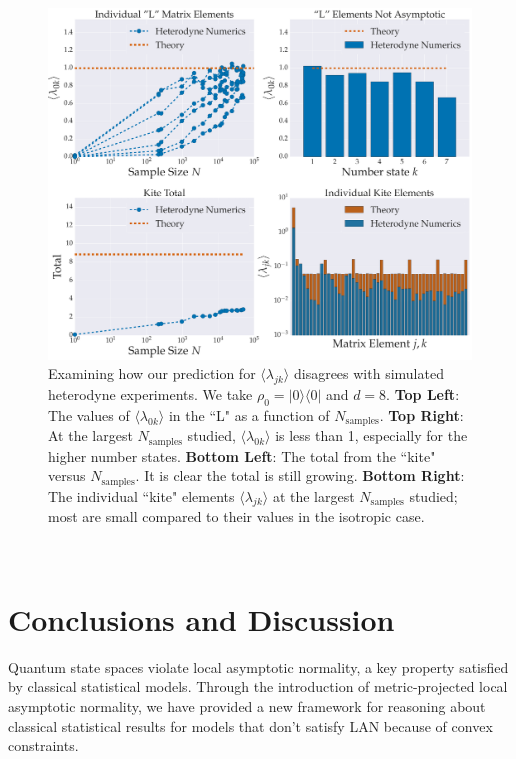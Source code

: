 \documentclass[aps,pra, twocolumn]{revtex4-1}
\begin{document}
\begin{figure}[t]
  \includegraphics[width=\columnwidth]{Images/Figure_14.pdf}
 \caption{Examining how our prediction for $\langle \lambda_{jk} \rangle$ disagrees with simulated heterodyne experiments. We take $\rho_{0} = |0\rangle\langle 0|$ and $d=8$. \textbf{Top Left}: The values of  $\langle \lambda_{0k}\rangle$ in the ``L" as a function of $N_{\mathrm{samples}}$.  \textbf{Top Right}:  At the largest $N_{\mathrm{samples}}$ studied, $\langle \lambda_{0k}\rangle$ is less than 1, especially for the higher number states. \textbf{Bottom Left}: The total from the ``kite" versus $N_{\mathrm{samples}}$. It is clear the total is still growing. \textbf{Bottom Right}: The individual ``kite" elements $\langle \lambda_{jk}\rangle$ at the largest $N_{\mathrm{samples}}$ studied;  most are small compared to their values in the isotropic case.}
\label{fig:individcontrib}
\end{figure}

~\\
\section{Conclusions and Discussion}
Quantum state spaces violate local asymptotic normality, a key property satisfied by classical statistical models. Through the introduction of metric-projected local asymptotic normality, we have provided a new framework for reasoning about classical statistical results for models that don't satisfy LAN because of convex constraints.
\end{document}

